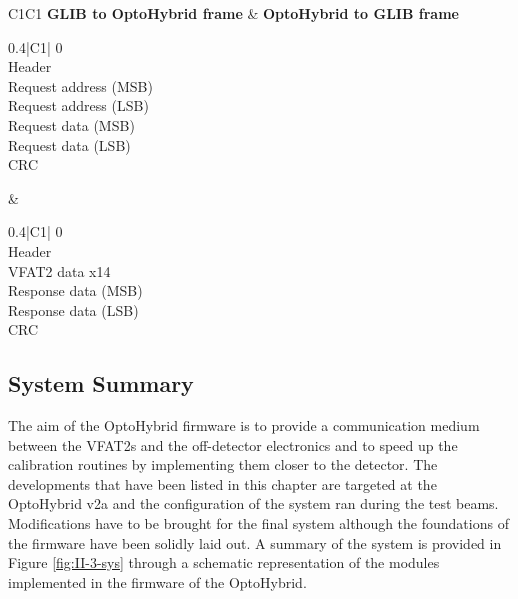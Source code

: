       \begin{table}
        \begin{tabularx}{\textwidth}{C{1}C{1}}
          \textbf{GLIB to OptoHybrid frame} & \textbf{OptoHybrid to GLIB frame} \\
          {
          \begin{tabularx}{0.4\textwidth}{|C{1}|}
             \hfill 0 \\ \hline
            Header \\ \hline
            Request address (MSB) \\ \hline
            Request address (LSB) \\ \hline
            Request data (MSB) \\ \hline
            Request data (LSB) \\ \hline
            CRC \\ \hline
          \end{tabularx} }
          &
          { \begin{tabularx}{0.4\textwidth}{|C{1}|}
             \hfill 0 \\ \hline
            Header \\ \hline
            VFAT2 data x14 \\ \hline
            Response data (MSB) \\ \hline
            Response data (LSB) \\ \hline
            CRC \\ \hline
          \end{tabularx} }
        \end{tabularx}
        \caption{Format of the data packets used to communicate between the GLIB and OptoHybrid.}
        \label{tab:II-3-data-format}
      \end{table}

    \subsection{System Summary}

      The aim of the OptoHybrid firmware is to provide a communication medium between the VFAT2s and the off-detector electronics and to speed up the calibration routines by implementing them closer to the detector. The developments that have been listed in this chapter are targeted at the OptoHybrid v2a and the configuration of the system ran during the test beams. Modifications have to be brought for the final system although the foundations of the firmware have been solidly laid out. A summary of the system is provided in Figure \ref{fig:II-3-sys} through a schematic representation of the modules implemented in the firmware of the OptoHybrid.

